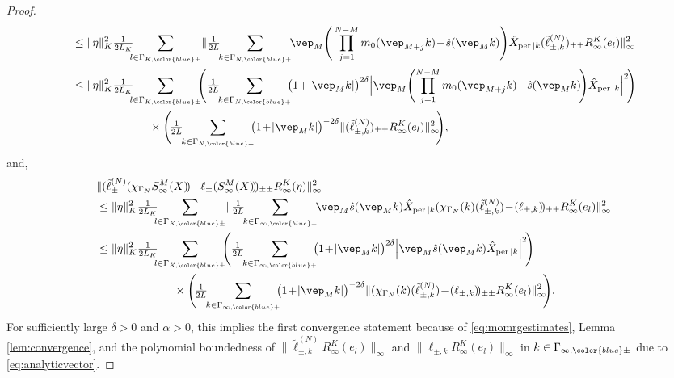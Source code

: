 \documentclass[a4paper, 11pt]{article}
\DeclareMathOperator{\1}{\mathds{1}}
\DeclareMathOperator{\per}{per}
\begin{document}
\begin{proof}
\begin{align*}
 & \leq \|\eta\|_{K}^{2}\tfrac{1}{2L_{K}}\!\!\!\sum_{l\in\Gamma_{K,{\color{blue}\pm}}}\!\|\tfrac{1}{2L}\!\!\sum_{k\in\Gamma_{N,{\color{blue}+}}}\!\!\vep_{M}\Bigg(\prod_{j=1}^{N-M}m_{0}(\vep_{M+j}k)\!-\!\hat{s}(\vep_{M}k)\Bigg)\hat{X}_{\per|k}(\tilde{\ell}^{(N)}_{\pm,k})_{\pm\pm}R^{K}_{\infty}(e_{l})\|_{\infty}^{2} \\
 & \leq \|\eta\|_{K}^{2}\tfrac{1}{2L_{K}}\!\!\!\sum_{l\in\Gamma_{K,{\color{blue}\pm}}}\!\!\!\Bigg(\tfrac{1}{2L}\!\!\sum_{k\in\Gamma_{N,{\color{blue}+}}}\!\!\!\big(1\!+\!|\vep_{M}k|\big)^{2\delta}\Big|\vep_{M}\Bigg(\!\prod_{j=1}^{N-M}m_{0}(\vep_{M+j}k)\!-\!\hat{s}(\vep_{M}k)\!\Bigg)\hat{X}_{\per|k}\Big|^{2}\!\Bigg) \\
 &\hspace{2.4cm} \times\Bigg(\!\tfrac{1}{2L}\!\!\sum_{k\in\Gamma_{N,{\color{blue}+}}}\!\!\!\big(1\!+\!|\vep_{M}k|\big)^{-2\delta}\|(\tilde{\ell}^{(N)}_{\pm,k})_{\pm\pm}R^{K}_{\infty}(e_{l})\|_{\infty}^{2}\!\!\Bigg),
\end{align*}
and,
\begin{align*}
 & \|(\tilde{\ell}^{(N)}_{\pm}(\chi_{\Gamma_{N}}S^{M}_{\infty}(X)\!)\!-\!\ell_{\pm}(S^{M}_{\infty}(X)\!)\!)_{\pm\pm}R^{K}_{\infty}(\eta)\|_{\infty}^{2} \\
 & \leq \|\eta\|_{K}^{2}\tfrac{1}{2L_{K}}\!\!\!\sum_{l\in\Gamma_{K,{\color{blue}\pm}}}\!\|\tfrac{1}{2L}\!\!\sum_{k\in\Gamma_{\infty,{\color{blue}+}}}\!\!\vep_{M}\hat{s}(\vep_{M}k)\hat{X}_{\per|k}(\chi_{\Gamma_{N}}(k)(\tilde{\ell}^{(N)}_{\pm,k})\!-\!(\ell_{\pm,k})\!)_{\pm\pm}R^{K}_{\infty}(e_{l})\|_{\infty}^{2} \\
 & \leq \|\eta\|_{K}^{2}\tfrac{1}{2L_{K}}\!\!\!\sum_{l\in\Gamma_{K,{\color{blue}\pm}}}\!\!\!\Bigg(\tfrac{1}{2L}\!\!\sum_{k\in\Gamma_{\infty,{\color{blue}+}}}\!\!\!\big(1\!+\!|\vep_{M}k|\big)^{2\delta}\Big|\vep_{M}\hat{s}(\vep_{M}k)\hat{X}_{\per|k}\Big|^{2}\!\Bigg) \\
 &\hspace{2.4cm} \times\Bigg(\!\tfrac{1}{2L}\!\!\sum_{k\in\Gamma_{\infty,{\color{blue}+}}}\!\!\!\big(1\!+\!|\vep_{M}k|\big)^{-2\delta}\|(\chi_{\Gamma_{N}}(k)(\tilde{\ell}^{(N)}_{\pm,k})\!-\!(\ell_{\pm,k})\!)_{\pm\pm}R^{K}_{\infty}(e_{l})\|_{\infty}^{2}\!\!\Bigg).
\end{align*}
For sufficiently large $\delta>0$ and $\alpha>0$, this implies the first convergence statement because of \eqref{eq:momrgestimates}, Lemma \ref{lem:convergence}, and the polynomial boundedness of $\|\tilde{\ell}^{(N)}_{\pm, k}R^{K}_{\infty}(e_{l})\|_{\infty}$ and $\|\ell_{\pm,k}R^{K}_{\infty}(e_{l})\|_{\infty}$ in $k\in\Gamma_{\infty,{\color{blue}\pm}}$ due to \eqref{eq:analyticvector}.


\end{proof}
\end{document}
